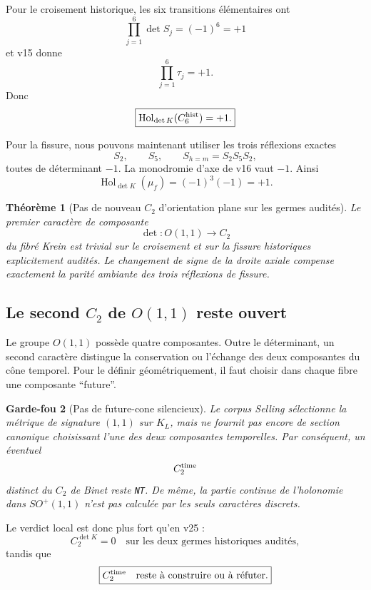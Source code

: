 \documentclass[11pt,a4paper]{article}
\newtheorem{theorem}{Théorème}[section]
\newtheorem{guardrail}[theorem]{Garde-fou}
\newcommand{\certNT}{\texttt{NT}}
\begin{document}
Pour le croisement historique, les six transitions élémentaires ont
\[
 \prod_{j=1}^{6}\det S_j=(-1)^6=+1
\]
et v15 donne
\[
 \prod_{j=1}^{6}\tau_j=+1.
\]
Donc
\begin{equation}\label{eq:v26-Krein-crossing-hol}
 \boxed{
 \operatorname{Hol}_{\det K}(C_6^{\rm hist})=+1.}
\end{equation}

Pour la fissure, nous pouvons maintenant utiliser les trois réflexions exactes
\[
 S_2,\qquad S_5,\qquad S_{h=m}=S_2S_5S_2,
\]
toutes de déterminant $-1$. La monodromie d'axe de v16 vaut $-1$. Ainsi
\begin{equation}\label{eq:v26-Krein-fissure-hol}
 \boxed{
 \operatorname{Hol}_{\det K}(\mu_f)
 =
 (-1)^3(-1)
 =
 +1.}
\end{equation}

\begin{theorem}[Pas de nouveau $C_2$ d'orientation plane sur les germes audités]\label{thm:v26-no-new-plane-C2}
Le premier caractère de composante
\[
 \det:O(1,1)\to C_2
\]
du fibré Krein est trivial sur le croisement et sur la fissure historiques explicitement audités. Le changement de signe de la droite axiale compense exactement la parité ambiante des trois réflexions de fissure.
\end{theorem}

\subsection{Le second \texorpdfstring{$C_2$}{C2} de \texorpdfstring{$O(1,1)$}{O(1,1)} reste ouvert}

Le groupe $O(1,1)$ possède quatre composantes. Outre le déterminant, un second caractère distingue la conservation ou l'échange des deux composantes du cône temporel. Pour le définir géométriquement, il faut choisir dans chaque fibre une composante ``future''.

\begin{guardrail}[Pas de future-cone silencieux]
Le corpus Selling sélectionne la métrique de signature $(1,1)$ sur $K_L$, mais ne fournit pas encore de section canonique choisissant l'une des deux composantes temporelles. Par conséquent, un éventuel
\[
 C_2^{\rm time}
\]
distinct du $C_2$ de Binet reste \certNT{}. De même, la partie continue de l'holonomie dans $SO^+(1,1)$ n'est pas calculée par les seuls caractères discrets.
\end{guardrail}

Le verdict local est donc plus fort qu'en v25 :
\[
 \boxed{
 C_2^{\det K}=0
 \quad\text{sur les deux germes historiques audités},}
\]
tandis que
\[
 \boxed{
 C_2^{\rm time}
 \quad\text{reste à construire ou à réfuter}.}
\]
\end{document}
